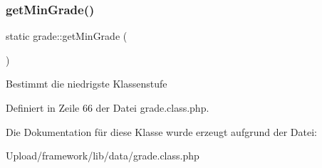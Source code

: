 \subsubsection{\texorpdfstring{get\+Min\+Grade()}{getMinGrade()}}
{\footnotesize\ttfamily static grade\+::get\+Min\+Grade (\begin{DoxyParamCaption}{ }\end{DoxyParamCaption})\hspace{0.3cm}{\ttfamily [static]}}

Bestimmt die niedrigste Klassenstufe 

Definiert in Zeile 66 der Datei grade.\+class.\+php.



Die Dokumentation für diese Klasse wurde erzeugt aufgrund der Datei\+:\begin{DoxyCompactItemize}
\item 
Upload/framework/lib/data/grade.\+class.\+php\end{DoxyCompactItemize}
